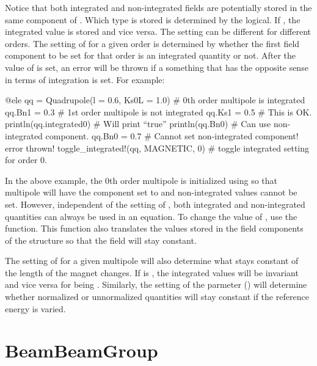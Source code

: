 Notice that both integrated
and non-integrated fields are potentially stored in the same component of .
Which type is stored is determined by the  logical. If , the integrated
value is stored and vice versa. The  setting can be different for different orders.
The setting of  for a given order is determined by whether the first field component
to be set for that order is an integrated quantity or not. After the value of  is set,
an error will be thrown if a something that has the opposite sense in terms of integration is 
set. For example:
\begin{example}
  @ele qq = Quadrupole(l = 0.6, Ks0L = 1.0)  # 0th order multipole is integrated
  qq.Bn1 = 0.3                  # 1st order multipole is not integrated
  qq.Ks1 = 0.5                  # This is OK.
  println(qq.integrated0)       # Will print ``true''
  println(qq.Bn0)               # Can use non-integrated component.
  qq.Bn0 = 0.7                  # Cannot set non-integrated component! error thrown!
  toggle_integrated!(qq, MAGNETIC, 0)  # toggle integrated setting for order 0.
\end{example}
In the above example, the 0th order multipole is initialized using  so that
multipole will have the  component set to  and non-integrated values
cannot be set. However, independent of the setting of , both integrated and
non-integrated quantities can always be used in an equation. To change the value of ,
use the  function. This function also translates the values stored in the
field components of the structure so that the field will stay constant.

The setting of  for a given multipole will also determine what stays constant
of the length of the magnet changes. If  is , the integrated values
will be invariant and vice versa for  being . Similarly, the setting
of the  parmeter () will determine whether normalized or
unnormalized quantities will stay constant if the reference energy is varied.

\section{BeamBeamGroup}
\label{s:beam.beam.g}

